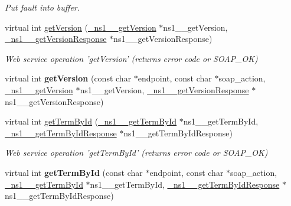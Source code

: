 \begin{DoxyCompactItemize}
\begin{DoxyCompactList}\small\item\em Put fault into buffer. \end{DoxyCompactList}\item 
\hypertarget{classOntologyQuerySoapBindingProxy_a7adf55f85f833a5a1d3933bd89d21b65}{
virtual int \hyperlink{classOntologyQuerySoapBindingProxy_a7adf55f85f833a5a1d3933bd89d21b65}{getVersion} (\hyperlink{class__ns1____getVersion}{\_\-ns1\_\-\_\-getVersion} $\ast$ns1\_\-\_\-getVersion, \hyperlink{class__ns1____getVersionResponse}{\_\-ns1\_\-\_\-getVersionResponse} $\ast$ns1\_\-\_\-getVersionResponse)}
\label{classOntologyQuerySoapBindingProxy_a7adf55f85f833a5a1d3933bd89d21b65}

\begin{DoxyCompactList}\small\item\em Web service operation 'getVersion' (returns error code or SOAP\_\-OK) \end{DoxyCompactList}\item 
\hypertarget{classOntologyQuerySoapBindingProxy_af7da07255f7151bef2cb8ab22df09e8e}{
virtual int {\bfseries getVersion} (const char $\ast$endpoint, const char $\ast$soap\_\-action, \hyperlink{class__ns1____getVersion}{\_\-ns1\_\-\_\-getVersion} $\ast$ns1\_\-\_\-getVersion, \hyperlink{class__ns1____getVersionResponse}{\_\-ns1\_\-\_\-getVersionResponse} $\ast$ns1\_\-\_\-getVersionResponse)}
\label{classOntologyQuerySoapBindingProxy_af7da07255f7151bef2cb8ab22df09e8e}

\item 
\hypertarget{classOntologyQuerySoapBindingProxy_ae69654cff577d3284763dc686f8a19c3}{
virtual int \hyperlink{classOntologyQuerySoapBindingProxy_ae69654cff577d3284763dc686f8a19c3}{getTermById} (\hyperlink{class__ns1____getTermById}{\_\-ns1\_\-\_\-getTermById} $\ast$ns1\_\-\_\-getTermById, \hyperlink{class__ns1____getTermByIdResponse}{\_\-ns1\_\-\_\-getTermByIdResponse} $\ast$ns1\_\-\_\-getTermByIdResponse)}
\label{classOntologyQuerySoapBindingProxy_ae69654cff577d3284763dc686f8a19c3}

\begin{DoxyCompactList}\small\item\em Web service operation 'getTermById' (returns error code or SOAP\_\-OK) \end{DoxyCompactList}\item 
\hypertarget{classOntologyQuerySoapBindingProxy_a9b6c32f27fd6f76d83684906700d5267}{
virtual int {\bfseries getTermById} (const char $\ast$endpoint, const char $\ast$soap\_\-action, \hyperlink{class__ns1____getTermById}{\_\-ns1\_\-\_\-getTermById} $\ast$ns1\_\-\_\-getTermById, \hyperlink{class__ns1____getTermByIdResponse}{\_\-ns1\_\-\_\-getTermByIdResponse} $\ast$ns1\_\-\_\-getTermByIdResponse)}
\label{classOntologyQuerySoapBindingProxy_a9b6c32f27fd6f76d83684906700d5267}


\end{DoxyCompactItemize}

